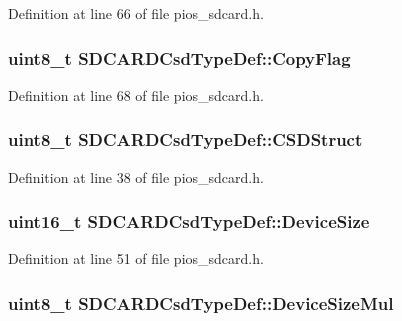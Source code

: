\-Definition at line 66 of file pios\-\_\-sdcard.\-h.

\hypertarget{group___p_i_o_s___s_d_c_a_r_d_ga24efbbd2c557f214a8bfcec06ce30d19}{
\subsubsection[{\-Copy\-Flag}]{\setlength{\rightskip}{0pt plus 5cm}uint8\-\_\-t {\bf \-S\-D\-C\-A\-R\-D\-Csd\-Type\-Def\-::\-Copy\-Flag}}}\label{group___p_i_o_s___s_d_c_a_r_d_ga24efbbd2c557f214a8bfcec06ce30d19}


\-Definition at line 68 of file pios\-\_\-sdcard.\-h.

\hypertarget{group___p_i_o_s___s_d_c_a_r_d_ga49354de313b96595043a78940055d651}{
\subsubsection[{\-C\-S\-D\-Struct}]{\setlength{\rightskip}{0pt plus 5cm}uint8\-\_\-t {\bf \-S\-D\-C\-A\-R\-D\-Csd\-Type\-Def\-::\-C\-S\-D\-Struct}}}\label{group___p_i_o_s___s_d_c_a_r_d_ga49354de313b96595043a78940055d651}


\-Definition at line 38 of file pios\-\_\-sdcard.\-h.

\hypertarget{group___p_i_o_s___s_d_c_a_r_d_ga32e9f1203e96670adc0e71599231da0f}{
\subsubsection[{\-Device\-Size}]{\setlength{\rightskip}{0pt plus 5cm}uint16\-\_\-t {\bf \-S\-D\-C\-A\-R\-D\-Csd\-Type\-Def\-::\-Device\-Size}}}\label{group___p_i_o_s___s_d_c_a_r_d_ga32e9f1203e96670adc0e71599231da0f}


\-Definition at line 51 of file pios\-\_\-sdcard.\-h.

\hypertarget{group___p_i_o_s___s_d_c_a_r_d_gafcf009add5954b88bd7b13630179acd1}{
\subsubsection[{\-Device\-Size\-Mul}]{\setlength{\rightskip}{0pt plus 5cm}uint8\-\_\-t {\bf \-S\-D\-C\-A\-R\-D\-Csd\-Type\-Def\-::\-Device\-Size\-Mul}}}\label{group___p_i_o_s___s_d_c_a_r_d_gafcf009add5954b88bd7b13630179acd1}


